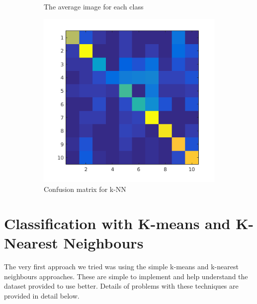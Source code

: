 \documentclass{article} %
\begin{document}
\begin{figure}[h]
\begin{subfigure}{.2\linewidth}
        \caption{The average image for each class}
        \end{subfigure}
        \begin{subfigure}{.2\linewidth}
            \centering
            \includegraphics[width=.5\linewidth]{images/knn-confusion.png}
            \caption{Confusion matrix for k-NN}
        \end{subfigure}
        \caption{}
    \end{figure}
    
    
    

\section{Classification with K-means and K-Nearest Neighbours}
    The very first approach we tried was using the simple k-means and k-nearest neighbours approaches. These are simple to implement and help understand the dataset provided to use better. Details of problems with these techniques are provided in detail below.
\end{document}
